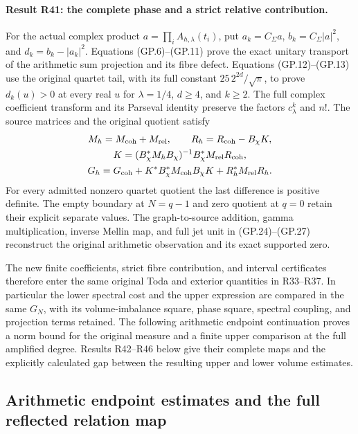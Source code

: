 \paragraph{Result R41: the complete phase and a strict relative contribution.}
For the actual complex product $a=\prod_i A_{h,\lambda}(t_i)$,
put $a_k=C_\Sigma a$, $b_k=C_\Sigma|a|^2$, and
$d_k=b_k-|a_k|^2$. Equations (GP.6)--(GP.11) prove the exact
unitary transport of the arithmetic sum projection and its fibre
defect. Equations (GP.12)--(GP.13) use the original quartet
tail, with its full constant $25\,2^{2d}/\sqrt\pi$, to prove
$d_k(u)>0$ at every real $u$ for $\lambda=1/4$, $d\geq4$,
and $k\geq2$. The full complex coefficient transform and its
Parseval identity preserve the factors $c_\lambda^k$ and $n!$.
The source matrices and the original quotient satisfy
\begin{gather*}
 M_h=M_{\rm coh}+M_{\rm rel},\qquad
 R_h=R_{\rm coh}-B_\chi K,\\
 K=(B_\chi^*M_hB_\chi)^{-1}B_\chi^*M_{\rm rel}R_{\rm coh},\\
 G_h=G_{\rm coh}+K^*B_\chi^*M_{\rm coh}B_\chi K
                            +R_h^*M_{\rm rel}R_h.
\end{gather*}
For every admitted nonzero quartet quotient the last difference
is positive definite. The empty boundary at $N=q-1$ and zero
quotient at $q=0$ retain their explicit separate values. The
graph-to-source addition, gamma multiplication, inverse Mellin
map, and full jet unit in (GP.24)--(GP.27) reconstruct the
original arithmetic observation and its exact supported zero.

The new finite coefficients, strict fibre contribution, and interval
certificates therefore enter the same original Toda and exterior
quantities in R33--R37. In particular the lower spectral cost and
the upper expression are compared in the same $G_N$, with its
volume-imbalance square, phase square, spectral coupling, and
projection terms retained. The following arithmetic endpoint continuation proves a norm bound
for the original measure and a finite upper comparison at the full
amplified degree. Results R42--R46 below give their complete maps
and the explicitly calculated gap between the resulting upper and
lower volume estimates.


\subsection{Arithmetic endpoint estimates and the full reflected relation map}


